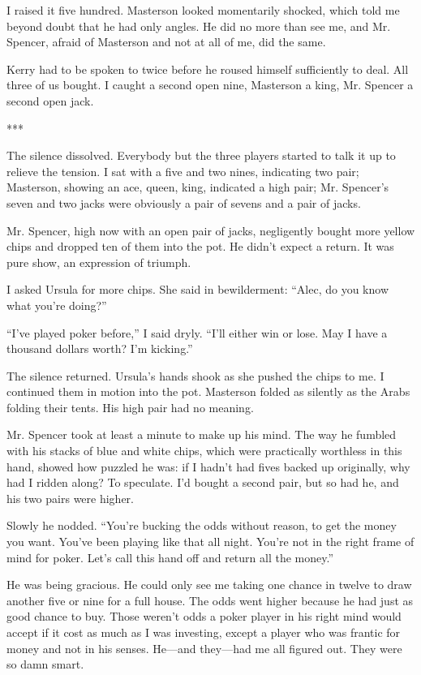 {I raised it five hundred. Masterson looked momentarily shocked, which told me beyond doubt that he had only angles. He did no more than see me, and Mr. Spencer, afraid of Masterson and not at all of me, did the same.

Kerry had to be spoken to twice before he roused himself sufficiently to deal. All three of us bought. I caught a second open nine, Masterson a king, Mr. Spencer a second open jack.

***

The silence dissolved. Everybody but the three players started to talk it up to relieve the tension. I sat with a five and two nines, indicating two pair; Masterson, showing an ace, queen, king, indicated a high pair; Mr. Spencer’s seven and two jacks were obviously a pair of sevens and a pair of jacks.

Mr. Spencer, high now with an open pair of jacks, negligently bought more yellow chips and dropped ten of them into the pot. He didn’t expect a return. It was pure show, an expression of triumph.

I asked Ursula for more chips. She said in bewilderment: “Alec, do you know what you’re doing?”

“I’ve played poker before,” I said dryly. “I’ll either win or lose. May I have a thousand dollars worth? I’m kicking.”

The silence returned. Ursula’s hands shook as she pushed the chips to me. I continued them in motion into the pot. Masterson folded as silently as the Arabs folding their tents. His high pair had no meaning.

Mr. Spencer took at least a minute to make up his mind. The way he fumbled with his stacks of blue and white chips, which were practically worthless in this hand, showed how puzzled he was: if I hadn’t had fives backed up originally, why had I ridden along? To speculate. I’d bought a second pair, but so had he, and his two pairs were higher.

Slowly he nodded. “You’re bucking the odds without reason, to get the money you want. You’ve been playing like that all night. You’re not in the right frame of mind for poker. Let’s call this hand off and return all the money.”

He was being gracious. He could only see me taking one chance in twelve to draw another five or nine for a full house. The odds went higher because he had just as good chance to buy. Those weren’t odds a poker player in his right mind would accept if it cost as much as I was investing, except a player who was frantic for money and not in his senses. He—and they—had me all figured out. They were so damn smart.

}
